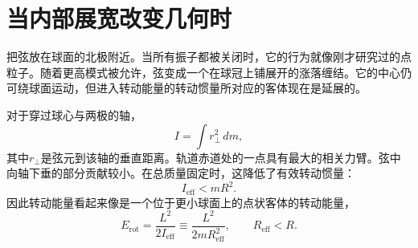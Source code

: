 \section{当内部展宽改变几何时}

把弦放在球面的北极附近。当所有振子都被关闭时，它的行为就像刚才研究过的点粒子。随着更高模式被允许，弦变成一个在球冠上铺展开的涨落缠结。它的中心仍可绕球面运动，但进入转动能量的转动惯量所对应的客体现在是延展的。

对于穿过球心与两极的轴，
\begin{equation}
  I=\int r_\perp^2\,dm,
  \label{eq:l09-extended-inertia}
\end{equation}
其中\(r_\perp\)是弦元到该轴的垂直距离。轨道赤道处的一点具有最大的相关力臂。弦中向轴下垂的部分贡献较小。在总质量固定时，这降低了有效转动惯量：
\begin{equation}
  I_{\mathrm{eff}}<mR^2.
  \label{eq:l09-inertia-reduction}
\end{equation}
因此转动能量看起来像是一个位于更小球面上的点状客体的转动能量，
\begin{equation}
  E_{\mathrm{rot}}
  =\frac{L^2}{2I_{\mathrm{eff}}}
  \equiv \frac{L^2}{2mR_{\mathrm{eff}}^2},
  \qquad R_{\mathrm{eff}}<R.
  \label{eq:l09-effective-radius}
\end{equation}

\begin{classroomqa}
\end{classroomqa}

